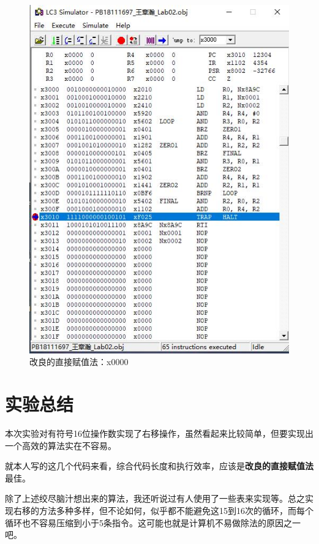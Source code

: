 \documentclass[UTF8]{article}
\begin{document}
\begin{figure}[H]
\begin{minipage}[H]{0.48\linewidth}
			\includegraphics[scale=0.4]{x0000_3.jpg}
			\caption{改良的直接赋值法：x0000}
			\label{x0000_3}
		\end{minipage}
	\end{figure}
	
	\section{实验总结}
	本次实验对有符号16位操作数实现了右移操作，虽然看起来比较简单，但要实现出一个高效的算法实在不容易。\par
	就本人写的这几个代码来看，综合代码长度和执行效率，应该是\textbf{改良的直接赋值法}最佳。\par
	除了上述绞尽脑汁想出来的算法，我还听说过有人使用了一些表来实现等。总之实现右移的方法多种多样，但不论如何，似乎都不能避免这15到16次的循环，而每个循环也不容易压缩到小于5条指令。这可能也就是计算机不易做除法的原因之一吧。\par
	
	
	
\end{document}
